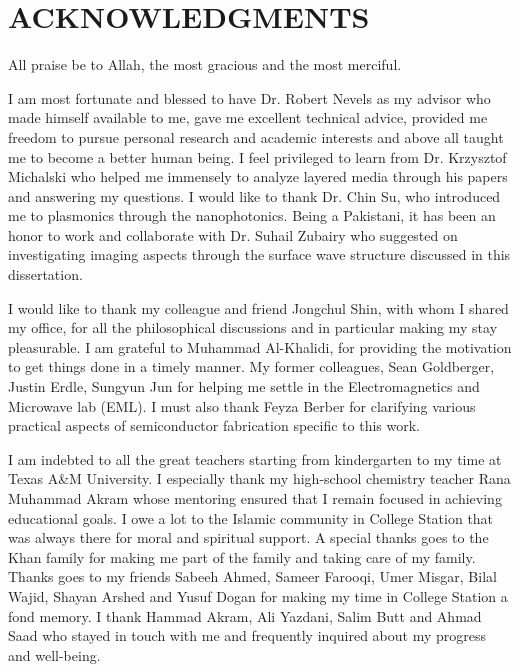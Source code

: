 %
%
%


\chapter*{ACKNOWLEDGMENTS}


\indent All praise be to Allah, the most gracious and the most merciful.

I am most fortunate and blessed to have Dr. Robert Nevels as my advisor who  made himself available to me, gave me excellent technical advice, provided me freedom to pursue personal research and academic interests and above all taught me to become a better human being. I feel privileged to learn from Dr. Krzysztof Michalski who helped me immensely to analyze layered media through his papers and answering my questions. I would like to thank Dr. Chin Su, who introduced me to plasmonics through the nanophotonics. Being a Pakistani, it has been an honor to work and collaborate with Dr. Suhail Zubairy who suggested on investigating imaging aspects through the surface wave structure discussed in this dissertation.

I would like to thank my colleague and friend Jongchul Shin, with whom I shared my office, for all the philosophical discussions and in particular making my stay pleasurable. I am grateful to Muhammad Al-Khalidi, for providing the motivation to get things done in a timely manner. My former colleagues, Sean Goldberger, Justin Erdle, Sungyun Jun for helping me settle in the Electromagnetics and Microwave lab (EML). I must also thank Feyza Berber for clarifying various practical aspects of semiconductor fabrication specific to this work.

I am indebted to all the great teachers starting from kindergarten to my time at Texas A\&M University. I especially thank my high-school chemistry teacher Rana Muhammad Akram whose mentoring ensured that I remain focused in achieving educational goals. I owe a lot to the Islamic community in College Station that was always there for moral and spiritual support. A special thanks goes to the Khan family for making me part of the family and taking care of my family. Thanks goes to my friends Sabeeh Ahmed, Sameer Farooqi, Umer Misgar, Bilal Wajid, Shayan Arshed and Yusuf Dogan for making my time in College Station a fond memory. I thank Hammad Akram, Ali Yazdani, Salim Butt and Ahmad Saad who stayed in touch with me and frequently inquired about my progress and well-being.

